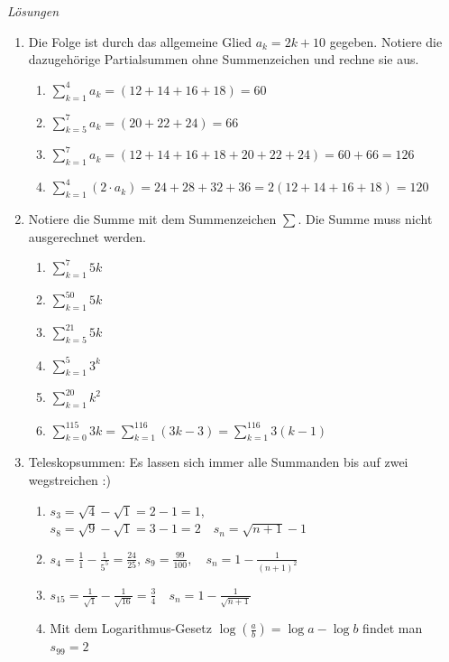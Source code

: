\clearpage
\emph{Lösungen}
\begin{enumerate}
    \item Die Folge ist durch das allgemeine Glied $a_k = 2k+10$ gegeben. Notiere die dazugehörige Partialsummen ohne Summenzeichen und rechne sie aus.
    \begin{enumerate}
        \item $\sum\limits_{k=1}^{4} a_k = (12 + 14 + 16 + 18) = 60$
        \item $\sum\limits_{k=5}^{7} a_k = (20 + 22 + 24) = 66$
        \item $\sum\limits_{k=1}^{7} a_k = (12 + 14 + 16 + 18 + 20 + 22 + 24) = 60 + 66 = 126$ 
        \item $\sum\limits_{k=1}^{4} (2\cdot a_k) = 24+28+32+36 = 2(12 + 14 + 16 + 18) = 120$
    \end{enumerate}

    \item Notiere die Summe mit dem Summenzeichen $\sum$. Die Summe muss nicht ausgerechnet werden.
    \begin{enumerate}
        \item $\sum\limits_{k=1}^{7} 5k$
        \item $\sum\limits_{k=1}^{50} 5k$
        \item $\sum\limits_{k=5}^{21} 5k$
        \item $\sum\limits_{k=1}^{5} 3^k$
        \item $\sum\limits_{k=1}^{20} k^2$
        \item $\sum\limits_{k=0}^{115} 3k = \sum\limits_{k=1}^{116} (3k -3)= \sum\limits_{k=1}^{116} 3(k -1)$
    \end{enumerate}

    \item Teleskopsummen: Es lassen sich immer alle Summanden bis auf zwei wegstreichen :)
    \begin{enumerate}
        \item $s_3 = \sqrt{4} - \sqrt{1} = 2 - 1 = 1$, \quad $s_8 = \sqrt{9} - \sqrt{1} = 3 - 1 = 2 \quad s_n = \sqrt{n+1} - 1$ 
        \item $s_4 = \frac{1}{1} - \frac{1}{5^5} = \frac{24}{25}$, \quad $s_9 = \frac{99}{100}, \quad s_n = 1-\frac{1}{(n+1)^2}$
        \item $s_{15} = \frac{1}{\sqrt{1}} - \frac{1}{\sqrt{16}} = \frac{3}{4} \quad s_n = 1-\frac{1}{\sqrt{n+1}}$
        \item Mit dem Logarithmus-Gesetz $\log(\frac{a}{b}) = \log a - \log b$ findet man 
        $s_{99} = 2$
    \end{enumerate}
\end{enumerate}

















